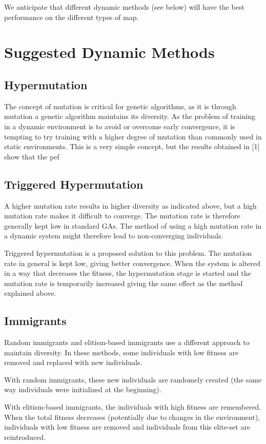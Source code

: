\documentclass[a4paper,12pt]{article}
\begin{document}
We anticipate that different dynamic methods (see below) will have the best performance on the different types of map.

\section{Suggested Dynamic Methods}
\subsection{Hypermutation}
The concept of mutation is critical for genetic algorithms, as it is through mutation a genetic algorithm maintains its diversity. As the problem of training in a dynamic environment is to avoid or overcome early convergence, it is tempting to try training with a higher degree of mutation than commonly used in static environments. This is a very simple concept, but the results obtained in [1] show that the pef

\subsection{Triggered Hypermutation}
A higher mutation rate results in higher diversity as indicated above, but a high mutation rate makes it difficult to converge. The mutation rate is therefore generally kept low in standard GAs. The method of using a high mutation rate in a dynamic system might therefore lead to non-converging individuals.

Triggered hypermutation is a proposed solution to this problem. The mutation rate in general is kept low, giving better convergence. When the system is altered in a way that decreases the fitness, the hypermutation stage is started and the mutation rate is temporarily increased giving the same effect as the method explained above.

\subsection{Immigrants}
Random immigrants and elitism-based immigrants use a different approach to maintain diversity. In these methods, some individuals with low fitness are removed and replaced with new individuals.

With random immigrants, these new individuals are randomely created (the same way individuals were initialized at the beginning).

With elitism-based immigrants, the individuals with high fitness are remembered. When the total fitness decreases (potentially due to changes in the environment), individuals with low fitness are removed and individuals from this elite-set are reintroduced.
\end{document}
